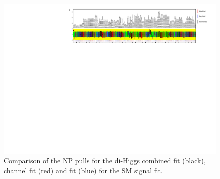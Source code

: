 \begin{figure}
\centering
\includegraphics[angle=270]{figures/results/HH/Combined/ComparisonPulls/NP_allExceptGammas.pdf}
\caption{Comparison of the NP pulls for the di-Higgs combined fit (black), \hadhad channel fit (red) and \lephad fit (blue) for the SM signal fit.}
\label{fig:CombinedPostfitNPPullsSMComparisonChannels}
\end{figure}

